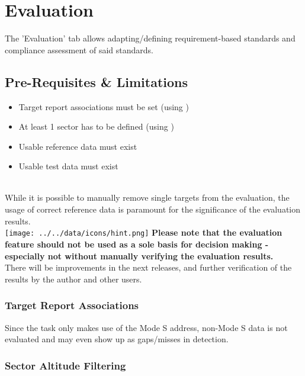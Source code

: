 \chapter{Evaluation}
\label{sec:eval} 

The 'Evaluation' tab allows adapting/defining requirement-based standards  and compliance assessment of said standards. \\

\section{Pre-Requisites \& Limitations}
\label{sec:eval_prereq} 

\begin{itemize}  
\item Target report associations must be set (using )
\item At least 1 sector has to be defined (using )
\item Usable reference data must exist
\item Usable test data must exist
\end{itemize}
\ \\

While it is possible to manually remove single targets from the evaluation, the usage of correct reference data is paramount for the significance of the evaluation results. \\

\texttt{[image: ../../data/icons/hint.png]} \textbf{Please note that the evaluation feature should not be used as a sole basis for decision making - especially not without manually verifying the evaluation results.} \\

There will be improvements in the next releases, and further verification of the results by the author and other users.

\subsection{Target Report Associations}

Since the task only makes use of the Mode S address, non-Mode S data is not evaluated and may even show up as gaps/misses in detection.

\subsection{Sector Altitude Filtering}

